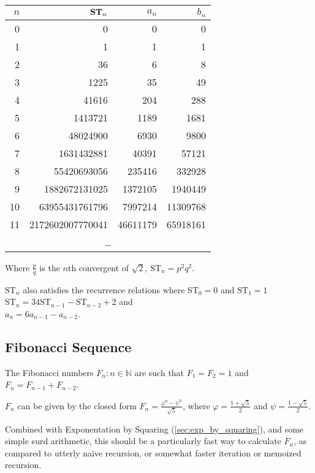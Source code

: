 \documentclass[a4paper,11pt]{article}
\begin{document}
    \begin{longtable}{rrrr}
    \toprule
    \boldmath$n$ & \boldmath$\text{\bfseries ST}_n$ & \boldmath$a_n$ &
                   \boldmath$b_n$ \\
    \midrule
    \endhead
    0 & 0 & 0 & 0 \\
    1 & 1 & 1 & 1 \\
    2 & 36 & 6 & 8 \\
    3 & 1225 & 35 & 49 \\
    4 & 41616 & 204 & 288 \\
    5 & 1413721 & 1189 & 1681 \\
    6 & 48024900 & 6930 & 9800 \\
    7 & 1631432881 & 40391 & 57121 \\
    8 & 55420693056 & 235416 & 332928 \\
    9 & 1882672131025 & 1372105 & 1940449 \\
    10 & 63955431761796 & 7997214 & 11309768 \\
    11 & 2172602007770041 & 46611179 & 65918161 \\
    \multicolumn{4}{c}{\ldots} \\
    \bottomrule
    \end{longtable}


    Where $\frac{p}{q}$ is the $n$th convergent of $\sqrt 2$,
    $\text{ST}_n = p^2 q^2$.

    $\text{ST}_n$ also satisfies the recurrence relations where
    $\text{ST}_0 = 0$ and $\text{ST}_1 = 1$
    \\$\text{ST}_n = 34\text{ST}_{n - 1} - \text{ST}_{n - 2} + 2$ and
    \\$a_n = 6a_{n - 1} - a_{n - 2}$.

    \subsection{Fibonacci Sequence}

    The Fibonacci numbers $F_n: n \in \mathbb{N}$ are such that $F_1 = F_2 = 1$
    and $F_n = F_{n - 1} + F_{n - 2}$.

    $F_n$ can be given by the closed form
    $\displaystyle F_n = \frac{\varphi^n - \psi^n}{\sqrt 5}$, where
    $\displaystyle \varphi = \frac{1 + \sqrt 5} 2$ and
    $\displaystyle \psi = \frac{1 - \sqrt 5} 2$.

    Combined with Exponentation by Squaring (\ref{sec:exp_by_squaring}), and
    some simple surd arithmetic, this should be a particularly fast way to
    calculate $F_n$, as compared to utterly na\"ive recursion, or somewhat
    faster iteration or memoized recursion.
\end{document}
